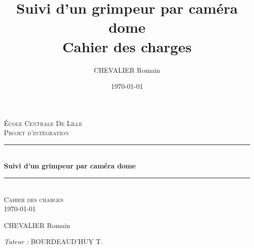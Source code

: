 \documentclass[a4paper, 11pt, french]{article}
\title{%
        \Huge Suivi d'un grimpeur par caméra dome \\
        \LARGE Cahier des charges}
\author{\LARGE CHEVALIER Romain}
\date{\today}
\newcommand{\HRule}{\rule{\linewidth}{0.5mm}}
\begin{document}
\begin{titlepage}

    \begin{titlepage}
        \begin{center}
      
      
          \textsc{\LARGE École Centrale De Lille}\\[2cm]
      
          \textsc{\huge Projet d'intégration}\\[2cm]
      
          \HRule \\[0.4cm]
          { \Huge \bfseries Suivi d'un grimpeur par caméra dome\\[0.4cm] }
      
          \HRule \\[2cm]

          \textsc{\Large Cahier des charges\\} {\large\today}\\[1.5cm]
          
          \vfill
      
          \begin{minipage}{0.4\textwidth}
            \begin{flushleft} \large
              CHEVALIER Romain\\
            \end{flushleft}
          \end{minipage}
          \begin{minipage}{0.4\textwidth}
            \begin{flushright} \large
              \emph{Tuteur :}  BOURDEAUD'HUY T. \\
            \end{flushright}
          \end{minipage}
      
          \vspace{1cm}
         
        \end{center}
      \end{titlepage}
    
    \normalsize
   
\end{titlepage}
\end{document}
